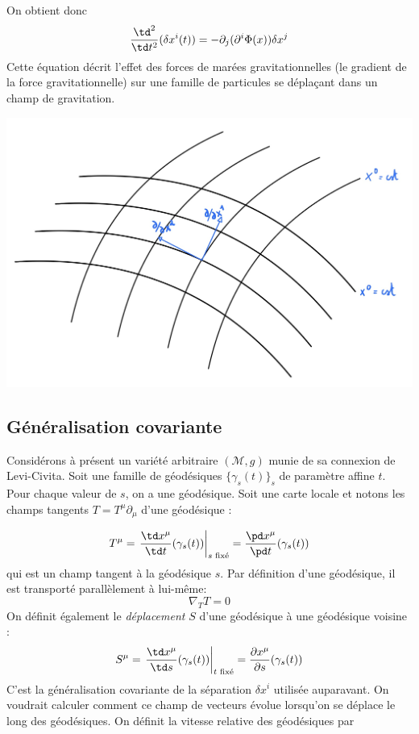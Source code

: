 On obtient donc
\begin{equation}
    \frac{\td ^2}{\td t^2}(\delta x^{i}(t)) = - \partial_{j}(\partial^{i}\Phi(x))\delta x^{j}
    \label{eq:forces de marées gravitationnelles}
\end{equation}
Cette équation décrit l'effet des forces de marées gravitationnelles (le gradient de la force gravitationnelle) sur une famille de 
particules se déplaçant dans un champ de gravitation.

\begin{center} \includegraphics[scale=0.15]{Chapitres/5. Géodésiques/Images/courbure d'espace .jpg} 
\end{center}

\subsection{Généralisation covariante}
Considérons à présent un variété arbitraire $(\mathcal{M},g)$ munie de sa connexion de Levi-Civita. Soit une famille de géodésiques $\{\gamma_{s}(t)\}_s$ de paramètre affine $t$. Pour chaque valeur de $s$, on a une géodésique. Soit une carte locale et notons les champs tangents $T = T^{\mu}\partial_{\mu}$ d'une géodésique : 

\begin{equation}
    T^{\mu} = \left. \frac{\td x^{\mu}}{\td t}(\gamma_{s}(t))\right|_{s \text{ fixé}} = \frac{\pd x^{\mu}}{\pd t}(\gamma_{s}(t))
\end{equation}
qui est un champ tangent à la géodésique $s$. Par définition d'une géodésique, il est transporté parallèlement à lui-même:
\begin{equation}
    \nabla_{T}T = 0
\end{equation}
On définit également le \emph{déplacement} $S$ d'une géodésique à une géodésique voisine :
\begin{equation}
    S^{\mu} =\left. \frac{\td x^{\mu}}{\td s}(\gamma_{s}(t))\right|_{t \text{ fixé}}= \frac{\partial x^{\mu}}{\partial s}(\gamma_{s}(t))
\end{equation}
C'est la généralisation covariante de la séparation $\delta x^{i}$ utilisée auparavant. On voudrait calculer comment ce champ de vecteurs évolue lorsqu'on se déplace le long des géodésiques. On définit la vitesse relative des géodésiques par 

